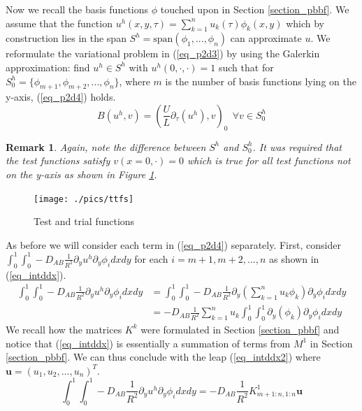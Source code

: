 \documentclass[11pt,fleqn]{article}
\theoremstyle{defstyle}
\newtheorem{rmrk}{Remark}[section]
\begin{document}
Now we recall the basis functions $\phi$ touched upon in Section \ref{section_pbbf}. We assume that the function $u^h(x,y,\tau) =\sum^n_{k=1} u_k(\tau) \phi_k(x, y)$ which by construction lies in the span $S^h=\text{span}(\phi_1,...,\phi_n)$ can approximate $u$. We reformulate the variational problem in (\ref{eq_p2d3}) by using the Galerkin approximation: find $u^h \in S^h$ with $u^h(0,\cdot,\cdot) = 1$ such that for $S^h_0=\{\phi_{m+1}, \phi_{m+2},...,\phi_n \}$, where $m$ is the number of basis functions lying on the y-axis, (\ref{eq_p2d4}) holds.
\begin{equation}
B(u^h,v) = (\frac{U}{L} \partial_\tau (u^h), v)_0~~ \forall v \in S^h_0
\label{eq_p2d4}
\end{equation}
\begin{rmrk}
Again, note the difference between $S^h$ and $S^h_0$. It was required that the test functions satisfy $v(x=0,\cdot)=0$ which is true for all test functions not on the y-axis as shown in Figure \ref{fig_ttfs}. 
\end{rmrk}
\begin{figure}[H] 
\centering
\texttt{[image: ./pics/ttfs]}
\caption{Test and trial functions} 
\label{fig_ttfs}
\end{figure}
As before we will consider each term in (\ref{eq_p2d4}) separately. First, consider $ \int_0^1 \int_0^1 -D_{AB}\frac{1}{R^2}\partial_y u^h \partial_y \phi_i dxdy$ for each $i=m+1, m+2,...,n$ as shown in (\ref{eq_intddx}).
\begin{equation}
\begin{aligned}
\int_0^1 \int_0^1 -D_{AB}\frac{1}{R^2}\partial_y u^h \partial_y \phi_i dxdy &= \int_0^1 \int_0^1 -D_{AB}\frac{1}{R^2}\partial_y \left(\sum^n_{k=1} u_k \phi_k\right) \partial_y \phi_i dxdy \\
&= -D_{AB}\frac{1}{R^2}\sum^n_{k=1} u_k\int_0^1 \int_0^1 \partial_y (\phi_k) \partial_y \phi_i dxdy  
\end{aligned}
\label{eq_intddx}
\end{equation}
We recall how the matrices $K^k$ were formulated in Section \ref{section_pbbf} and notice that (\ref{eq_intddx}) is essentially a summation of terms from $M^1$ in Section \ref{section_pbbf}. We can thus conclude with the leap (\ref{eq_intddx2}) where $\mathbf{u} = \left(u_1,u_2,...,u_n\right)^T$.
\begin{equation}
\int_0^1 \int_0^1 -D_{AB}\frac{1}{R^2}\partial_y u^h \partial_y \phi_i dxdy = -D_{AB}\frac{1}{R^2}K^1_{m+1:n, 1:n}\mathbf{u}
\label{eq_intddx2}
\end{equation}
\end{document}
